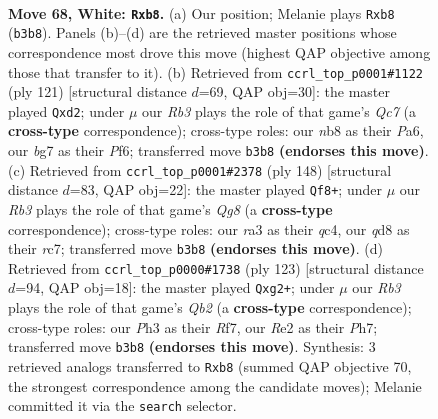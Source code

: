 \documentclass[11pt]{article}
\begin{document}
\clearpage

\begin{figure}[p]\centering
\begin{subfigure}{0.46\textwidth}\centering
\resizebox{\linewidth}{!}{%
\newchessgame
\chessboard[
  setfen={1n1q1kr1/6b1/6Q1/6P1/3P1P1p/rR5P/4R2K/8 w - - 2 68},
  showmover=false,
  pgfstyle=straightmove, color=movearrow, markmove={b3-b8}
]}
\caption{}
\end{subfigure}\hfill
\begin{subfigure}{0.46\textwidth}\centering
\resizebox{\linewidth}{!}{%
\newchessgame
\chessboard[
  setfen={7k/6p1/p4p1p/Pp3P2/1r6/7P/2qQ1B2/3R2K1 b - - 4 61},
  showmover=false,
  pgfstyle=straightmove, color=movearrow, markmove={c2-d2}
]}
\caption{}
\end{subfigure}
\\[4pt]
\begin{subfigure}{0.46\textwidth}\centering
\resizebox{\linewidth}{!}{%
\newchessgame
\chessboard[
  setfen={1R4Q1/2r1k3/5b1p/8/2q5/2P4P/6P1/7K w - - 2 75},
  showmover=false,
  pgfstyle=straightmove, color=movearrow, markmove={g8-f8}
]}
\caption{}
\end{subfigure}\hfill
\begin{subfigure}{0.46\textwidth}\centering
\resizebox{\linewidth}{!}{%
\newchessgame
\chessboard[
  setfen={7k/1q3r1p/1P1pn3/4p3/8/6BP/6QK/1R6 b - - 0 62},
  showmover=false,
  pgfstyle=straightmove, color=movearrow, markmove={b7-g2}
]}
\caption{}
\end{subfigure}
\caption{\textbf{Move 68, White: \texttt{Rxb8}.} (a) Our position; Melanie plays \texttt{Rxb8} (\texttt{b3b8}). Panels (b)--(d) are the retrieved master positions whose correspondence most drove this move (highest QAP objective among those that transfer to it). (b) Retrieved from \texttt{ccrl\_top\_p0001\#1122} (ply 121) [structural distance $d$=69, QAP obj=30]: the master played \texttt{Qxd2}; under $\mu$ our \emph{Rb3} plays the role of that game's \emph{Qc7} (a \textbf{cross-type} correspondence); cross-type roles: our \emph{n}b8 as their \emph{P}a6, our \emph{b}g7 as their \emph{P}f6; transferred move \texttt{b3b8} \textbf{(endorses this move)}. (c) Retrieved from \texttt{ccrl\_top\_p0001\#2378} (ply 148) [structural distance $d$=83, QAP obj=22]: the master played \texttt{Qf8+}; under $\mu$ our \emph{Rb3} plays the role of that game's \emph{Qg8} (a \textbf{cross-type} correspondence); cross-type roles: our \emph{r}a3 as their \emph{q}c4, our \emph{q}d8 as their \emph{r}c7; transferred move \texttt{b3b8} \textbf{(endorses this move)}. (d) Retrieved from \texttt{ccrl\_top\_p0000\#1738} (ply 123) [structural distance $d$=94, QAP obj=18]: the master played \texttt{Qxg2+}; under $\mu$ our \emph{Rb3} plays the role of that game's \emph{Qb2} (a \textbf{cross-type} correspondence); cross-type roles: our \emph{P}h3 as their \emph{R}f7, our \emph{R}e2 as their \emph{P}h7; transferred move \texttt{b3b8} \textbf{(endorses this move)}. Synthesis: 3 retrieved analogs transferred to \texttt{Rxb8} (summed QAP objective 70, the strongest correspondence among the candidate moves); Melanie committed it via the \texttt{search} selector.}
\label{fig:thought-m134}
\end{figure}
\end{document}
